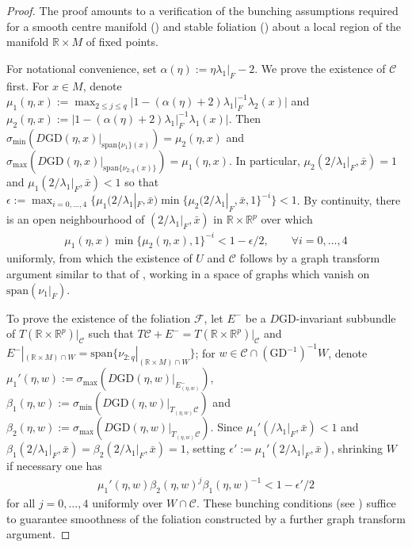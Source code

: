 \documentclass{article}
\newcommand{\RB}{\mathbb{R}}
\newcommand{\FC}{\mathcal{F}}
\newcommand{\CC}{\mathcal{C}}
\newcommand{\GD}{\mathrm{GD}}
\theoremstyle{plain}
\theoremstyle{definition}
\theoremstyle{remark}
\begin{document}
\begin{proof}
The proof amounts to a verification of the bunching assumptions required for a smooth centre manifold (\cite[Chapter 5]{hpsinvariant}) and stable foliation (\cite[Theorem 6]{fenichel1974asymptotic}) about a local region of the manifold $\RB\times M$ of fixed points.

For notational convenience, set $\alpha(\eta):=\eta\lambda_1|_F-2$. We prove the existence of $\CC$ first. For $x\in M$, denote $\mu_1(\eta,x):=\max_{2\leq j\leq q}|1-(\alpha(\eta)+2)\lambda_1|_F^{-1}\lambda_2(x)|$ and $\mu_2(\eta,x):=|1-(\alpha(\eta)+2)\lambda_1|_F^{-1}\lambda_1(x)|$. Then $\sigma_{\min}(D\GD(\eta,x)|_{\mathrm{span}\{\nu_1\}(x)}) = \mu_2(\eta,x)$ and $\sigma_{\max}(D\GD(\eta,x)|_{\mathrm{span}\{\nu_{2:q}(x)\}}) = \mu_1(\eta,x)$. In particular, $\mu_2(2/\lambda_1|_F,\bar{x}) = 1$ and $\mu_1(2/\lambda_1|_F,\bar{x})<1$ so that $\epsilon:=\max_{i=0,\dots,4}\{\mu_1(2/\lambda_1|_F,\bar{x})\min\{\mu_2(2/\lambda_1|_F,\bar{x},1\}^{-i}\}<1$. By continuity, there is an open neighbourhood of $(2/\lambda_1|_F,\bar{x})$ in $\RB\times\RB^p$ over which
\begin{align}
    \mu_1(\eta,x)\min\{\mu_2(\eta,x),1\}^{-i} < 1-\epsilon/2,\qquad \forall i=0,\dots,4
\end{align}
uniformly, from which the existence of $U$ and $\CC$ follows by a graph transform argument similar to that of \cite[Chapter 5]{hpsinvariant}, working in a space of graphs which vanish on $\mathrm{span}(\nu_1|_F)$.

To prove the existence of the foliation $\FC$, let $E^-$ be a $D\GD$-invariant subbundle of $T(\RB\times\RB^p)|_{\CC}$ such that $T\CC + E^- = T(\RB\times\RB^p)|_{\CC}$ and $E^-|_{(\RB\times M)\cap W} = \mathrm{span}\{\nu_{2:q}|_{(\RB\times M)\cap W}\}$; for $w\in\CC\cap (\GD^{-1})^{-1}W$, denote $\mu_1'(\eta,w):=\sigma_{\max}(D\GD(\eta,w)|_{E^-_{(\eta,w)}})$, $\beta_1(\eta,w):=\sigma_{\min}(D\GD(\eta,w)|_{T_{(\eta,w)}\CC})$ and $\beta_2(\eta,w):=\sigma_{\max}(D\GD(\eta,w)|_{T_{(\eta,w)}\CC})$. Since $\mu_1'(/\lambda_1|_F,\bar{x})<1$ and $\beta_1(2/\lambda_1|_F,\bar{x}) = \beta_2(2/\lambda_1|_F,\bar{x}) = 1$, setting $\epsilon':=\mu_1'(2/\lambda_1|_F,\bar{x})$, shrinking $W$ if necessary one has
\begin{align}
\mu_1'(\eta,w)\beta_2(\eta,w)^j\beta_1(\eta,w)^{-1}<1-\epsilon'/2
\end{align}
for all $j=0,\dots,4$ uniformly over $W\cap\CC$. These bunching conditions (see \cite[Theorem 6]{fenichel1974asymptotic}) suffice to guarantee smoothness of the foliation constructed by a further graph transform argument.
\end{proof}
\end{document}
